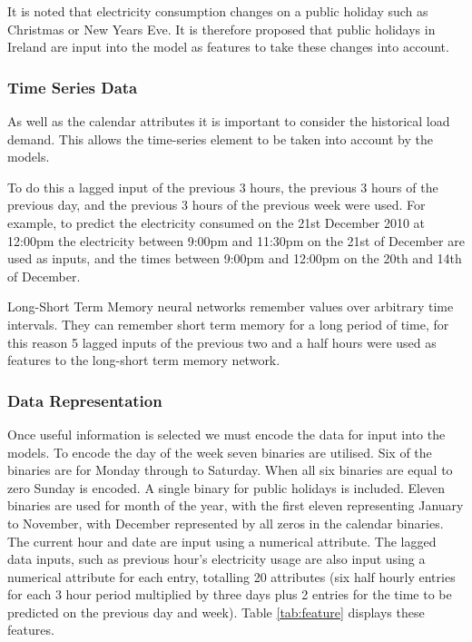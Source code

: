 It is noted that electricity consumption changes on a public holiday such as Christmas or New Years Eve. It is therefore proposed that public holidays in Ireland are input into the model as features to take these changes into account. 

\subsubsection{Time Series Data}

As well as the calendar attributes it is important to consider the historical load demand. This allows the time-series element to be taken into account by the models. 

To do this a lagged input of the previous 3 hours, the previous 3 hours of the previous day, and the previous 3 hours of the previous week were used. For example, to predict the electricity consumed on the 21st December 2010 at 12:00pm the electricity between 9:00pm and 11:30pm on the 21st of December are used as inputs, and the times between 9:00pm and 12:00pm on the 20th and 14th of December.

Long-Short Term Memory neural networks remember values over arbitrary time intervals. They can remember short term memory for a long period of time, for this reason 5 lagged inputs of the previous two and a half hours were used as features to the long-short term memory network.

\subsubsection{Data Representation}

Once useful information is selected we must encode the data for input into the models. To encode the day of the week seven binaries are utilised. Six of the binaries are for Monday through to Saturday. When all six binaries are equal to zero Sunday is encoded. A single binary for public holidays is included. Eleven binaries are used for month of the year, with the first eleven representing January to November, with December represented by all zeros in the calendar binaries. The current hour and date are input using a numerical attribute. The lagged data inputs, such as previous hour's electricity usage are also input using a numerical attribute for each entry, totalling 20 attributes (six half hourly entries for each 3 hour period multiplied by three days plus 2 entries for the time to be predicted on the previous day and week). Table \ref{tab:feature} displays these features.


